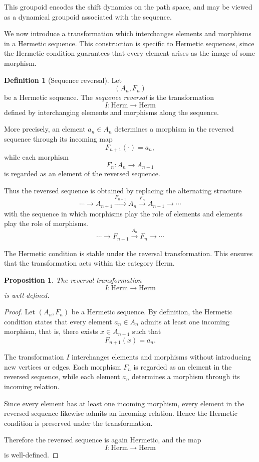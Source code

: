 \documentclass[11pt]{book}
\theoremstyle{definition}
\newtheorem{definition}{Definition}[section]
\theoremstyle{plain}
\newtheorem{proposition}[theorem]{Proposition}
\theoremstyle{remark}
\begin{document}
This groupoid encodes the shift dynamics on the path space,
and may be viewed as a dynamical groupoid associated with
the sequence.

We now introduce a transformation which interchanges
elements and morphisms in a Hermetic sequence.
This construction is specific to Hermetic sequences,
since the Hermetic condition guarantees that every
element arises as the image of some morphism.

\begin{definition}[Sequence reversal]
Let
\[
(A_n,F_n)
\]
be a Hermetic sequence. The \emph{sequence reversal}
is the transformation
\[
I : \mathrm{Herm} \longrightarrow \mathrm{Herm}
\]
defined by interchanging elements and morphisms along
the sequence.

More precisely, an element $a_n \in A_n$ determines
a morphism in the reversed sequence through its
incoming map
\[
F_{n+1}(\cdot)=a_n,
\]
while each morphism
\[
F_n : A_n \to A_{n-1}
\]
is regarded as an element of the reversed sequence.

Thus the reversed sequence is obtained by replacing
the alternating structure
\[
\cdots \to A_{n+1} \xrightarrow{F_{n+1}} A_n
\xrightarrow{F_n} A_{n-1} \to \cdots
\]
with the sequence in which morphisms play the role
of elements and elements play the role of morphisms.
\[\cdots \to F_{n+1} \xrightarrow{A_n} F_n \to \cdots\]
\end{definition}

The Hermetic condition is stable under the reversal
transformation. This ensures that the transformation
acts within the category $\mathrm{Herm}$.

\begin{proposition}
The reversal transformation
\[
I : \mathrm{Herm} \to \mathrm{Herm}
\]
is well-defined.
\end{proposition}

\begin{proof}
Let $(A_n,F_n)$ be a Hermetic sequence.
By definition, the Hermetic condition states that every
element $a_n\in A_n$ admits at least one incoming morphism,
that is, there exists $x\in A_{n+1}$ such that
\[
F_{n+1}(x)=a_n .
\]

The transformation $I$ interchanges elements and morphisms
without introducing new vertices or edges. Each morphism
$F_n$ is regarded as an element in the reversed sequence,
while each element $a_n$ determines a morphism through its
incoming relation.

Since every element has at least one incoming morphism,
every element in the reversed sequence likewise admits an
incoming relation. Hence the Hermetic condition is preserved
under the transformation.

Therefore the reversed sequence is again Hermetic, and the
map
\[
I : \mathrm{Herm} \to \mathrm{Herm}
\]
is well-defined.
\end{proof}
\end{document}
